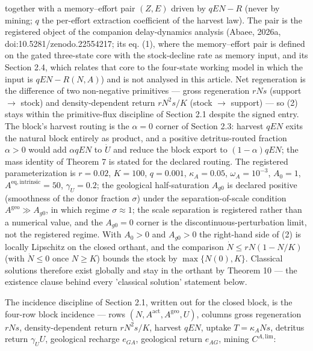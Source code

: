 \documentclass[11pt]{article}
\begin{document}
 together with a memory--effort pair \((Z, E)\) driven by \(qEN - R\) (never by mining; \(q\) the per-effort extraction coefficient of the harvest law). The pair is the registered object of the companion delay-dynamics analysis (Abaee, 2026a, doi:10.5281/\allowbreak{}zenodo.22554217; its eq. (1), where the memory--effort pair is defined on the gated three-state core with the stock-decline rate as memory input, and its Section 2.4, which relates that core to the four-state working model in which the input is \(qEN - R(N, A)\)) and is not analysed in this article. Net regeneration is the difference of two non-negative primitives --- gross regeneration \(rNs\) (support \(\to\) stock) and density-dependent return \(rN^2 s/\allowbreak{}K\) (stock \(\to\) support) --- so (2) stays within the primitive-flux discipline of Section 2.1 despite the signed entry. The block's harvest routing is the \(\alpha = 0\) corner of Section 2.3: harvest \(qEN\) exits the natural block entirely as product, and a positive detritus-routed fraction \(\alpha > 0\) would add \(\alpha qEN\) to \(\dot U\) and reduce the block export to \((1-\alpha)qEN\); the mass identity of Theorem 7 is stated for the declared routing. The registered parameterization is \(r = 0.02\), \(K = 100\), \(q = 0.001\), \(\kappa_A = 0.05\), \(\omega_A = 10^{-3}\), \(A_0 = 1\), \(A^{\mathrm{eq,\allowbreak{}intrinsic}} =\allowbreak{} 50\), \(\gamma_U = 0.2\); the geological half-saturation \(A_{g0}\) is declared positive (smoothness of the donor fraction \(\sigma\)) under the separation-of-scale condition \(A^{\mathrm{geo}} \gg A_{g0}\), in which regime \(\sigma \approx 1\); the scale separation is registered rather than a numerical value, and the \(A_{g0} = 0\) corner is the discontinuous-perturbation limit, not the registered regime. With \(A_0 > 0\) and \(A_{g0} > 0\) the right-hand side of (2) is locally Lipschitz on the closed orthant, and the comparison \(\dot N \le rN(1 - N/\allowbreak{}K)\) (with \(\dot N \le 0\) once \(N \ge K\)) bounds the stock by \(\max\{N(0), K\}\). Classical solutions therefore exist globally and stay in the orthant by Theorem 10 --- the existence clause behind every 'classical solution' statement below.

The incidence discipline of Section 2.1, written out for the closed block, is the four-row block incidence --- rows \((N,\allowbreak{} A^{\mathrm{act}},\allowbreak{} A^{\mathrm{geo}},\allowbreak{} U)\), columns gross regeneration \(rNs\), density-dependent return \(rN^2 s/\allowbreak{}K\), harvest \(qEN\), uptake \(T = \kappa_A N s\), detritus return \(\gamma_U U\), geological recharge \(e_{GA}\), geological return \(e_{AG}\), mining \(C^{A,\mathrm{lim}}\): 
\end{document}
